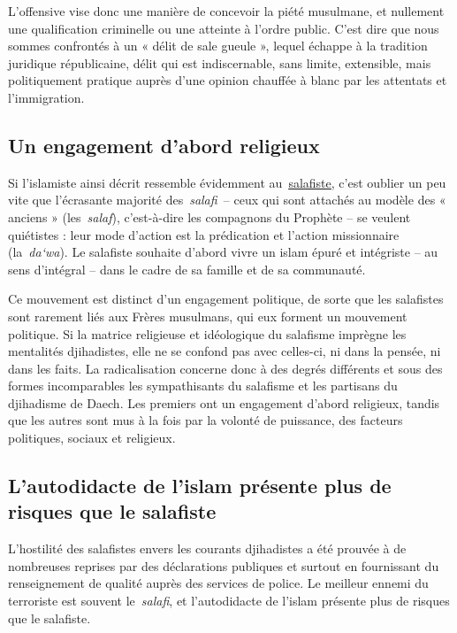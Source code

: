 L'offensive vise donc une manière de concevoir la piété musulmane, et
nullement une qualification criminelle ou une atteinte à l'ordre public.
C'est dire que nous sommes confrontés à un « délit de sale gueule »,
lequel échappe à la tradition juridique républicaine, délit qui est
indiscernable, sans limite, extensible, mais politiquement pratique
auprès d'une opinion chauffée à blanc par les attentats et
l'immigration.

\subsection{Un engagement d'abord religieux}

Si l'islamiste ainsi décrit ressemble évidemment
au~\href{https://www.la-croix.com/Religion/Islam/Quest-salafisme-2018-10-14-1200975866}{\underline{salafiste}},
c'est oublier un peu vite que l'écrasante majorité des~\emph{salafi~}--
ceux qui sont attachés au modèle des « anciens » (les~\emph{salaf}),
c'est-à-dire les compagnons du Prophète -- se veulent quiétistes : leur
mode d'action est la prédication et l'action missionnaire
(la~\emph{da`wa}). Le salafiste souhaite d'abord vivre un islam épuré et
intégriste -- au sens d'intégral -- dans le cadre de sa famille et de sa
communauté.

Ce mouvement est distinct d'un engagement politique, de sorte que les
salafistes sont rarement liés aux Frères musulmans, qui eux forment un
mouvement politique. Si la matrice religieuse et idéologique du
salafisme imprègne les mentalités djihadistes, elle ne se confond pas
avec celles-ci, ni dans la pensée, ni dans les faits. La radicalisation
concerne donc à des degrés différents et sous des formes incomparables
les sympathisants du salafisme et les partisans du djihadisme de Daech.
Les premiers ont un engagement d'abord religieux, tandis que les autres
sont mus à la fois par la volonté de puissance, des facteurs politiques,
sociaux et religieux.

\subsection{L'autodidacte de l'islam présente plus de risques que le
salafiste}

L'hostilité des salafistes envers les courants djihadistes a été prouvée
à de nombreuses reprises par des déclarations publiques et surtout en
fournissant du renseignement de qualité auprès des services de police.
Le meilleur ennemi du terroriste est souvent le~\emph{salafi}, et
l'autodidacte de l'islam présente plus de risques que le salafiste.

